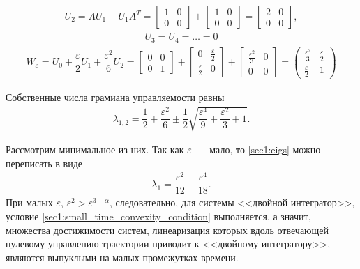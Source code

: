 \documentclass[../main.tex]{subfiles}
\begin{document}
\begin{gather*}
     U_2 = A U_1 + U_1 A^T = \left[ {\begin{array}{*{20}{c}}
             1&0\\
             0&0
     \end{array}}\right] + \left[ {\begin{array}{*{20}{c}}
             1&0\\
             0&0
     \end{array}}\right] = \left[ {\begin{array}{*{20}{c}}
             2&0\\
             0&0
     \end{array}}\right],
\end{gather*}
\begin{gather*}
     U_3 = U_4 = \dots = 0
\end{gather*}
\begin{gather*}
     W_{\varepsilon} = U_0 + \dfrac{\varepsilon}{2} U_1 + \dfrac{\varepsilon^2}{6} U_2 = \left[ {\begin{array}{*{20}{c}}
             0&0\\
             0&1
     \end{array}}\right] + \left[ {\begin{array}{*{20}{c}}
             0&\frac{\varepsilon}{2}\\
             \frac{\varepsilon}{2}&0
     \end{array}}\right] +\left[ {\begin{array}{*{20}{c}}
             \frac{\varepsilon^2}{3}&0\\
             0&0
     \end{array}}\right] =  
     \begin{pmatrix}
         \frac{\varepsilon^2}{3}&\frac{\varepsilon}{2}\\
         \frac{\varepsilon}{2}&1
     \end{pmatrix} 
\end{gather*}
 
Собственные числа грамиана управляемости равны
\begin{gather}\label{sec1:eigs}
     \lambda_{1,2} = \dfrac{1}{2}+\dfrac{\varepsilon^2}{6} \pm \dfrac{1}{2}\sqrt{\dfrac{\varepsilon^4}{9} + \dfrac{\varepsilon^2}{3} +1}.
\end{gather}
 
Рассмотрим минимальное из них.
Так как $ \varepsilon $~--- мало, то \eqref{sec1:eigs} можно переписать в виде
\begin{gather*}
    \lambda_1 = \dfrac{\varepsilon^2}{12} - \dfrac{\varepsilon^4}{18}.
\end{gather*} 
При малых $ \varepsilon  $, $ \varepsilon^2 >  \varepsilon^{3-\alpha}  $, следовательно,  для системы <<двойной интегратор>>, условие \eqref{sec1:small_time_convexity_condition} выполняется, а значит, множества достижимости систем, линеаризация которых вдоль отвечающей нулевому управлению траектории приводит к <<двойному интегратору>>, являются выпуклыми на малых промежутках времени.
\end{document}
